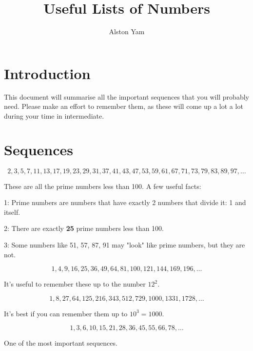 \documentclass{article}
\title{Useful Lists of Numbers}
\author{Alston Yam}
\theoremstyle{mytheoremstyle}
\theoremstyle{mytheoremstyle}
\theoremstyle{myproblemstyle}
\begin{document}
    \maketitle

    \section{Introduction}
    This document will summarise all the important sequences that you will probably need. Please make an effort to remember them, as these will come up a lot a lot during your time in intermediate. 

    \section{Sequences}
    \begin{theorem}
        \[2, 3, 5, 7, 11, 13, 17, 19, 23, 29, 31, 37, 41, 43, 47, 53, 59, 61, 67, 71, 73, 79, 83, 89, 97, \dots\]
    \end{theorem}

    These are all the prime numbers less than 100. A few useful facts:
    
    1: Prime numbers are numbers that have exactly 2 numbers that divide it: 1 and itself.
    
    2: There are exactly \textbf{25} prime numbers less than 100.
    
    3: Some numbers like 51, 57, 87, 91 may "look" like prime numbers, but they are not.

    \begin{theorem}
        \[1, 4, 9, 16, 25, 36, 49, 64, 81, 100, 121, 144, 169, 196, \dots\]
    \end{theorem}

    It's useful to remember these up to the number $12^2$.

    \begin{theorem}
        \[1, 8, 27, 64, 125, 216, 343, 512, 729, 1000, 1331, 1728, \dots\]
    \end{theorem}

    It's best if you can remember them up to $10^3 = 1000$.

    \begin{theorem}
        \[1, 3, 6, 10, 15, 21, 28, 36, 45, 55, 66, 78, \dots\]
    \end{theorem}

    One of the most important sequences. 
\end{document}
